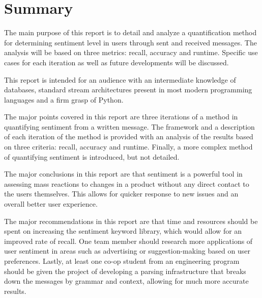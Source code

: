 \section*{Summary} %
\label{sec:summary}

The main purpose of this report is to detail and analyze a quantification method for determining sentiment level in users through sent and received messages.  The analysis will be based on three metrics: recall, accuracy and runtime.  Specific use cases for each iteration as well as future developments will be discussed.\newline
 
This report is intended for an audience with an intermediate knowledge of databases, standard stream architectures present in most modern programming languages and a firm grasp of Python.\newline

The major points covered in this report are three iterations of a method in quantifying sentiment from a written message. The framework and a description of each iteration of the method is provided with an analysis of the results based on three criteria: recall, accuracy and runtime.  Finally, a more complex method of quantifying sentiment is introduced, but not detailed.\newline

The major conclusions in this report are that sentiment is a powerful tool in assessing mass reactions to changes in a product without any direct contact to the users themselves.  This allows for quicker response to new issues and an overall better user experience.\newline

The major recommendations in this report are that time and resources should be spent on increasing the sentiment keyword library, which would allow for an improved rate of recall.  One team member should research more applications of user sentiment in areas such as advertising or suggestion-making based on user preferences.  Lastly, at least one co-op student from an engineering program should be given the project of developing a parsing infrastructure that breaks down the messages by grammar and context, allowing for much more accurate results.
